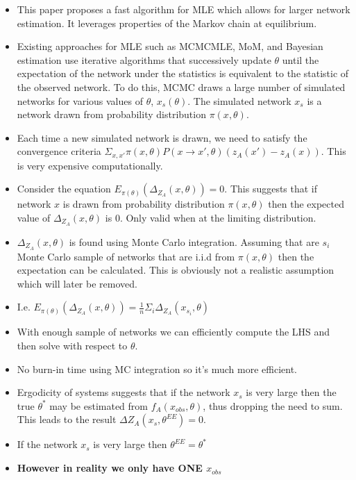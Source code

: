 \begin{itemize}
    \item This paper proposes a fast algorithm for MLE which allows for larger network estimation. It leverages properties of the Markov chain at equilibrium.
    \item Existing approaches for MLE such as MCMCMLE, MoM, and Bayesian estimation use iterative algorithms that successively update $\theta$ until the expectation of the network under the statistics is equivalent to the statistic of the observed network. To do this, MCMC draws a large number of simulated networks for various values of $\theta$, $x_{s}(\theta)$. The simulated network $x_{s}$ is a network drawn from probability distribution $\pi(x, \theta)$.
    \item Each time a new simulated network is drawn, we need to satisfy the convergence criteria $\Sigma_{x,x'}\pi(x, \theta)P(x \rightarrow x', \theta)(z_{A}(x') - z_{A}(x))$. This is very expensive computationally.
    \item Consider the equation $E_{\pi(\theta)}(\Delta_{Z_{A}}(x, \theta)) = 0$. This suggests that if network $x$ is drawn from probability distribution $\pi(x, \theta)$ then the expected value of $\Delta_{Z_{A}}(x, \theta)$ is 0. Only valid when at the limiting distribution.
    \item $\Delta_{Z_{A}}(x, \theta)$ is found using Monte Carlo integration. Assuming that are $s_{i}$ Monte Carlo sample of networks that are i.i.d from $\pi(x, \theta)$ then the expectation can be calculated. This is obviously not a realistic assumption which will later be removed.
    \item I.e. $E_{\pi(\theta)}(\Delta_{Z_{A}}(x, \theta)) = \frac{1}{n}\Sigma_{i}\Delta_{Z_{A}}(x_{s_{i}}, \theta)$
    \item With enough sample of networks we can efficiently compute the LHS and then solve with respect to $\theta$.
    \item No burn-in time using MC integration so it's much more efficient.
    \item Ergodicity of systems suggests that if the network $x_{s}$ is very large then the true $\theta^{*}$ may be estimated from $f_{A}(x_{obs}, \theta)$, thus dropping the need to sum. This leads to the result $\Delta Z_{A}(x_s, \theta^{EE}) = 0$.
    \item If the network $x_{s}$ is very large then $\theta^{EE} = \theta^*$
    \item \textbf{However in reality we only have ONE $x_{obs}$}

\end{itemize}
